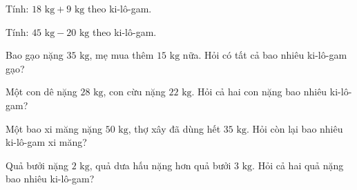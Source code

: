\begin{ex} %
Tính: $18\text{ kg} + 9\text{ kg}$ theo ki-lô-gam.
\end{ex}

\begin{ex} %
Tính: $45\text{ kg} - 20\text{ kg}$ theo ki-lô-gam.
\end{ex}

\begin{ex} %
Bao gạo nặng $35\text{ kg}$, mẹ mua thêm $15\text{ kg}$ nữa. Hỏi có tất cả bao nhiêu ki-lô-gam gạo?
\end{ex}

\begin{ex} %
Một con dê nặng $28\text{ kg}$, con cừu nặng $22\text{ kg}$. Hỏi cả hai con nặng bao nhiêu ki-lô-gam?
\end{ex}

\begin{ex} %
Một bao xi măng nặng $50\text{ kg}$, thợ xây đã dùng hết $35\text{ kg}$. Hỏi còn lại bao nhiêu ki-lô-gam xi măng?
\end{ex}

\begin{ex} %
Quả bưởi nặng $2\text{ kg}$, quả dưa hấu nặng hơn quả bưởi $3\text{ kg}$. Hỏi cả hai quả nặng bao nhiêu ki-lô-gam?
\end{ex}
